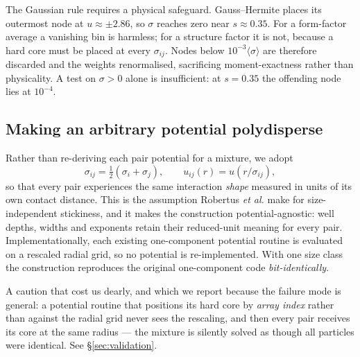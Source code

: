 \documentclass[11pt,a4paper]{article}
\begin{document}
The Gaussian rule requires a physical safeguard. Gauss--Hermite places its
outermost node at $u\approx\pm2.86$, so $\sigma$ reaches zero near
$s\approx0.35$. For a form-factor average a vanishing bin is harmless; for a
structure factor it is not, because a hard core must be placed at every
$\sigma_{ij}$. Nodes below $10^{-3}\langle\sigma\rangle$ are therefore
discarded and the weights renormalised, sacrificing moment-exactness rather
than physicality. A test on $\sigma>0$ alone is insufficient: at $s=0.35$ the
offending node lies at $10^{-4}$.

\subsection{Making an arbitrary potential polydisperse}

Rather than re-deriving each pair potential for a mixture, we adopt
\begin{equation}
\sigma_{ij} = \tfrac12(\sigma_i+\sigma_j), \qquad
u_{ij}(r) = u\!\left(r/\sigma_{ij}\right),
\label{eq:reducedtail}
\end{equation}
so that every pair experiences the same interaction \emph{shape} measured in
units of its own contact distance. This is the assumption Robertus \emph{et
al.} \citep{Robertus1989} make for size-independent stickiness, and it makes the
construction potential-agnostic: well depths, widths and exponents retain their
reduced-unit meaning for every pair. Implementationally, each existing
one-component potential routine is evaluated on a rescaled radial grid, so no
potential is re-implemented. With one size class the construction reproduces
the original one-component code \emph{bit-identically}.

A caution that cost us dearly, and which we report because the failure mode is
general: a potential routine that positions its hard core by \emph{array
index} rather than against the radial grid never sees the rescaling, and then
every pair receives its core at the same radius --- the mixture is silently
solved as though all particles were identical. See \S\ref{sec:validation}.
\end{document}
